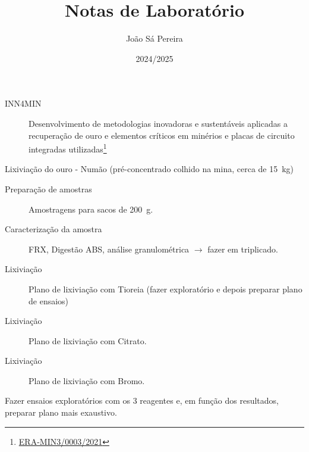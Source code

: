 \documentclass[a4paper]{tufte-handout}
\title{Notas de Laboratório}
\author{João Sá Pereira}
\date{2024/2025}
\begin{document}
\maketitle

\vspace*{\fill}
\begin{projects}
	\begin{description}
		\item [INN4MIN] Desenvolvimento de metodologias inovadoras e sustentáveis aplicadas a recuperação de ouro e elementos críticos em minérios e placas de circuito integradas utilizadas\footnote{\href{https://cerena.pt/projects/inn4min-development-innovative-and-sustainable-approaches-applied-recovery-gold-and-1}{ERA-MIN3/0003/2021}}
	\end{description}
\end{projects}

\begin{planos}
    Lixiviação do ouro - Numão (pré-concentrado colhido na mina, cerca de 15~kg)
    \begin{description}
        \item [Preparação de amostras] Amostragens para sacos de 200~g.
        \item [Caracterização da amostra] FRX, Digestão ABS, análise granulométrica $\rightarrow$ fazer em triplicado.
        \item [Lixiviação] Plano de lixiviação com Tioreia (fazer exploratório e depois preparar plano de ensaios)
        \item [Lixiviação] Plano de lixiviação com Citrato.
        \item [Lixiviação] Plano de lixiviação com Bromo.
    \end{description}
    Fazer ensaios exploratórios com os 3 reagentes e, em função dos resultados, preparar plano mais exaustivo.
\end{planos}
\vspace*{\fill}

\pagebreak


\end{document}
